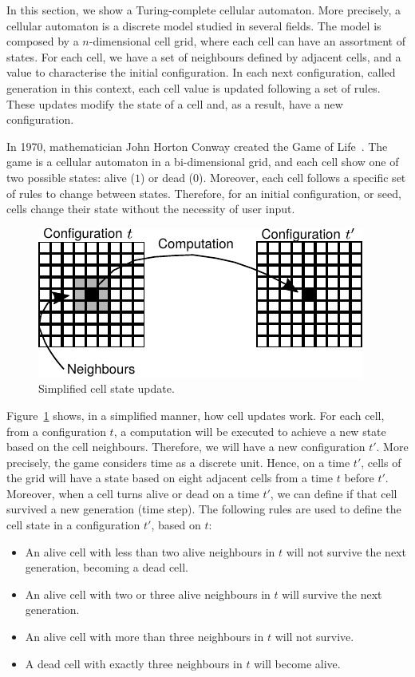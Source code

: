 \documentclass[12pt]{article}
\begin{document}
In this section, we show a Turing-complete cellular automaton. More precisely,
a cellular automaton is a discrete model studied in several fields. The model
is composed by a $n$-dimensional cell grid, where each cell can have an
assortment of states. For each cell, we have a set of neighbours defined by
adjacent cells, and a value to characterise the initial configuration. In each
next configuration, called generation in this context, each cell value is
updated following a set of rules. These updates modify the state of a cell and,
as a result, have a new configuration.

In 1970, mathematician John Horton Conway created the Game of
Life~\cite{Gardner:article:1970:oct}. The game is a cellular automaton in a
bi-dimensional grid, and each cell show one of two possible states: alive ($1$)
or dead ($0$). Moreover, each cell follows a specific set of rules to change
between states. Therefore, for an initial configuration, or seed, cells change
their state without the necessity of user input.

\begin{figure}[h]
    \centering
    \includegraphics{images/stencil.pdf}
    \caption{Simplified cell state update.}
    \label{fig:stencil}
\end{figure}

Figure~\ref{fig:stencil} shows, in a simplified manner, how cell updates work.
For each cell, from a configuration $t$, a computation will be executed to
achieve a new state based on the cell neighbours. Therefore, we will have a new
configuration $t'$. More precisely, the game considers time as a discrete unit.
Hence, on a time $t'$, cells of the grid will have a state based on eight
adjacent cells from a time $t$ before $t'$. Moreover, when a cell turns alive
or dead on a time $t'$, we can define if that cell survived a new generation
(time step). The following rules are used to define the cell state in a
configuration $t'$, based on $t$:

\begin{itemize}
    \item An alive cell with less than two alive neighbours in $t$ will not
        survive the next generation, becoming a dead cell.
    \item An alive cell with two or three alive neighbours in $t$ will survive
        the next generation.
    \item An alive cell with more than three neighbours in $t$ will not
        survive.
    \item A dead cell with exactly three neighbours in $t$ will become alive.
\end{itemize}
\end{document}
